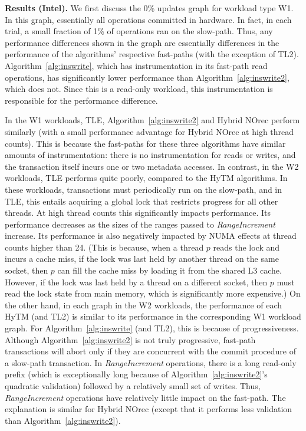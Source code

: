 \vspace{1mm}\noindent\textbf{Results (Intel).}
We first discuss the 0\% updates graph for workload type W1.
In this graph, essentially all operations committed in hardware.
In fact, in each trial, a small fraction of 1\% of operations ran on the slow-path.
Thus, any performance differences shown in the graph are essentially differences in the performance of the algorithms' respective fast-paths (with the exception of TL2).
Algorithm~\ref{alg:inswrite}, which has instrumentation in its fast-path read operations, has significantly lower performance than Algorithm~\ref{alg:inswrite2}, which does not.
Since this is a read-only workload, this instrumentation is responsible for the performance difference.

In the W1 workloads, TLE, Algorithm~\ref{alg:inswrite2} and Hybrid NOrec perform similarly (with a small performance advantage for Hybrid NOrec at high thread counts).
This is because the fast-paths for these three algorithms have similar amounts of instrumentation: there is no instrumentation for reads or writes, 
and the transaction itself incurs one or two metadata accesses.
In contrast, in the W2 workloads, TLE performs quite poorly, compared to the HyTM algorithms.
In these workloads, transactions must periodically run on the slow-path, and in TLE, 
this entails acquiring a global lock that restricts progress for all other threads.
At high thread counts this significantly impacts performance.
Its performance decreases as the sizes of the ranges passed to \textit{RangeIncrement} increase.
Its performance is also negatively impacted by NUMA effects at thread counts higher than 24.
(This is because, when a thread $p$ reads the lock and incurs a cache miss, 
if the lock was last held by another thread on the same socket, 
then $p$ can fill the cache miss by loading it from the shared L3 cache.
However, if the lock was last held by a thread on a different socket, 
then $p$ must read the lock state from main memory, which is significantly more expensive.)
On the other hand, in each graph in the W2 workloads, the performance of each HyTM (and TL2) is similar to its performance in the corresponding W1 workload graph.
For Algorithm~\ref{alg:inswrite} (and TL2), this is because of progressiveness.
Although Algorithm~\ref{alg:inswrite2} is not truly progressive, fast-path transactions will abort only if they are concurrent with the commit procedure of a slow-path transaction.
In \textit{RangeIncrement} operations, there is a long read-only prefix (which is exceptionally long because of Algorithm~\ref{alg:inswrite2}'s quadratic validation) followed by a relatively small set of writes.
Thus, \textit{RangeIncrement} operations have relatively little impact on the fast-path.
The explanation is similar for Hybrid NOrec (except that it performs less validation than Algorithm~\ref{alg:inswrite2}).

